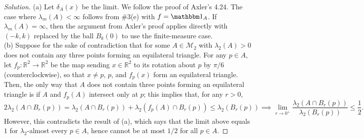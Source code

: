 \documentclass[10pt]{article}
\providecommand{\half}{\frac{1}{2}}
\providecommand{\RR}{\mathbb R}
\providecommand{\ind}{\mathbbm 1}
\newenvironment{soln}{\begin{proof}[Solution]}{\end{proof}}
\begin{document}
\begin{soln}
    (a) Let $\delta_A(x)$ be the limit. We follow the proof of Axler's 4.24.
    The case where $\lambda_m(A) < \infty$ follows from \#3(e) with $f = \ind_A$.
    If $\lambda_m(A) = \infty$, then the argument from Axler's proof
    applies directly with $(-k,k)$ replaced by the ball $B_k(0)$
    to use the finite-measure case.
    \\

    (b) Suppose for the sake of contradiction that for some $A\in\mathcal M_2$
    with $\lambda_2(A) > 0$ does not contain any three points
    forming an equilateral triangle. For any $p\in A$,
    let $f_p\colon\RR^2\to\RR^2$ be the map sending $x\in\RR^2$ to
    its rotation about $p$ by $\pi/6$ (counterclockwise),
    so that $x\ne p$, $p$, and $f_p(x)$ form an equilateral triangle.
    Then, the only way that $A$ does not contain three points
    forming an equilateral triangle is if
    $A$ and $f_p(A)$ intersect only at $p$;
    this implies that, for any $r > 0$,
    \begin{equation*}
	2\lambda_2(A\cap B_r(p))
	= \lambda_2(A\cap B_r(p)) + \lambda_2(f_p(A)\cap B_r(p))
	\le \lambda_2(B_r(p))
	\implies \lim_{r\to0^+} \frac{\lambda_2(A\cap B_r(p))}{\lambda_2(B_r(p))}
	\le\half.
    \end{equation*}
    However, this contradicts the result of (a), which says that
    the limit above equals $1$ for $\lambda_2$-almost every $p\in A$,
    hence cannot be at most $1/2$ for all $p\in A$.
\end{soln}
\end{document}
